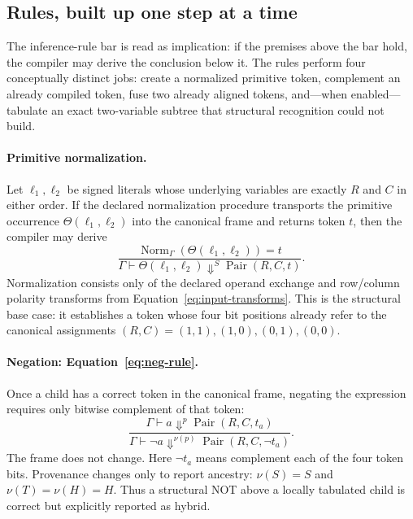 \documentclass[10pt]{article}
\newcommand{\Pair}{\operatorname{Pair}}
\theoremstyle{plain}
\theoremstyle{definition}
\theoremstyle{remark}
\begin{document}
\subsection{Rules, built up one step at a time}

The inference-rule bar is read as implication: if the premises above the bar hold, the compiler may derive the conclusion below it. The rules perform four conceptually distinct jobs: create a normalized primitive token, complement an already compiled token, fuse two already aligned tokens, and---when enabled---tabulate an exact two-variable subtree that structural recognition could not build.

\paragraph{Primitive normalization.}
Let $\ell_1,\ell_2$ be signed literals whose underlying variables are exactly $R$ and $C$ in either order. If the declared normalization procedure transports the primitive occurrence $\Theta(\ell_1,\ell_2)$ into the canonical frame and returns token $t$, then the compiler may derive
\[
\frac{
  \operatorname{Norm}_{\Gamma}(\Theta(\ell_1,\ell_2))=t
}{
  \Gamma\vdash \Theta(\ell_1,\ell_2)\Downarrow^S \Pair(R,C,t)
}.
\]
Normalization consists only of the declared operand exchange and row/column polarity transforms from Equation~\eqref{eq:input-transforms}. This is the structural base case: it establishes a token whose four bit positions already refer to the canonical assignments $(R,C)=(1,1),(1,0),(0,1),(0,0)$.

\paragraph{Negation: Equation~\eqref{eq:neg-rule}.}
Once a child has a correct token in the canonical frame, negating the expression requires only bitwise complement of that token:
\begin{equation}
\frac{\Gamma\vdash a\Downarrow^p\Pair(R,C,t_a)}
{\Gamma\vdash \neg a\Downarrow^{\nu(p)}\Pair(R,C,\neg t_a)}.
\label{eq:neg-rule}
\end{equation}
The frame does not change. Here $\neg t_a$ means complement each of the four token bits. Provenance changes only to report ancestry: $\nu(S)=S$ and $\nu(T)=\nu(H)=H$. Thus a structural NOT above a locally tabulated child is correct but explicitly reported as hybrid.
\end{document}
